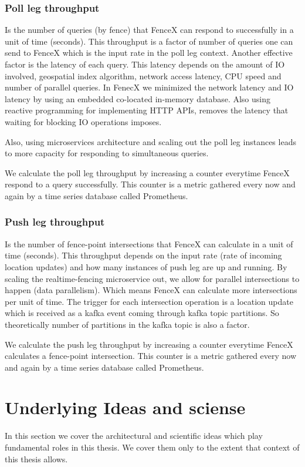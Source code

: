 \documentclass[a4]{report}
\begin{document}
    \subsubsection{Poll leg throughput}
    Is the number of queries (by fence) that FenceX can respond to successfully in a unit of time (seconds).
    This throughput is a factor of number of queries one can send to FenceX which is the input rate in the poll leg
    context.
    Another effective factor is the latency of each query.
    This latency depends on the amount of IO involved, geospatial index algorithm, network access latency, CPU speed
    and number of parallel queries.
    In FenecX we minimized the network latency and IO latency by using an embedded co-located in-memory database.
    Also using reactive programming for implementing HTTP APIs, removes the latency that waiting for blocking IO
    operations imposes.

    Also, using microservices architecture and scaling out the poll leg instances leads to more capacity for responding
    to simultaneous queries.

    We calculate the poll leg throughput by increasing a counter everytime FenceX respond to a query successfully.
    This counter is a metric gathered every now and again by a time series database called Prometheus.
    \subsubsection{Push leg throughput}
    Is the number of fence-point intersections that FenceX can calculate in a unit of time (seconds).
    This throughput depends on the input rate (rate of incoming location updates) and how many instances of push leg
    are up and running.
    By scaling the realtime-fencing microservice out, we allow for parallel intersections to happen (data parallelism).
    Which means FenceX can calculate more intersections per unit of time.
    The trigger for each intersection operation is a location update which is received as a kafka event coming through
    kafka topic partitions.
    So theoretically number of partitions in the kafka topic is also a factor.

    We calculate the push leg throughput by increasing a counter everytime FenceX calculates a fence-point intersection.
    This counter is a metric gathered every now and again by a time series database called Prometheus.
    

    \section{Underlying Ideas and sciense}
    In this section we cover the architectural and scientific ideas which play fundamental roles in this thesis.
    We cover them only to the extent that context of this thesis allows.
\end{document}
